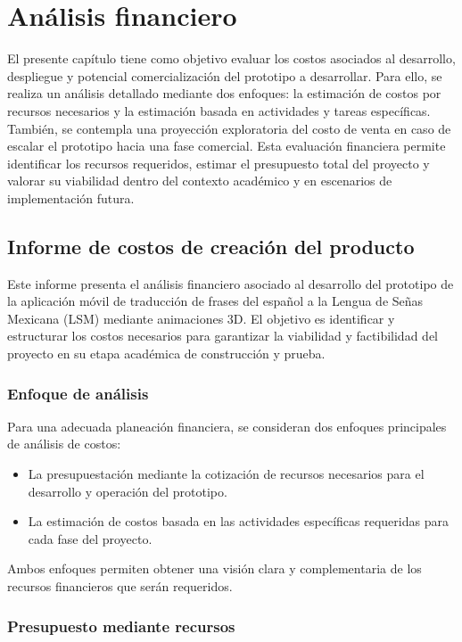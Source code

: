 \chapter{Análisis financiero}

El presente capítulo tiene como objetivo evaluar los costos asociados al desarrollo, despliegue y potencial comercialización del prototipo a desarrollar. Para ello, se realiza un análisis detallado mediante dos enfoques: la estimación de costos por recursos necesarios y la estimación basada en actividades y tareas específicas. También, se contempla una proyección exploratoria del costo de venta en caso de escalar el prototipo hacia una fase comercial. Esta evaluación financiera permite identificar los recursos requeridos, estimar el presupuesto total del proyecto y valorar su viabilidad dentro del contexto académico y en escenarios de implementación futura.


\section{Informe de costos de creación del producto}

Este informe presenta el análisis financiero asociado al desarrollo del prototipo de la aplicación móvil de traducción de frases del español a la Lengua de Señas Mexicana (LSM) mediante animaciones 3D. El objetivo es identificar y estructurar los costos necesarios para garantizar la viabilidad y factibilidad del proyecto en su etapa académica de construcción y prueba.

\subsection{Enfoque de análisis}

Para una adecuada planeación financiera, se consideran dos enfoques principales de análisis de costos: 
\begin{itemize}
	\item La presupuestación mediante la cotización de recursos necesarios para el desarrollo y operación del prototipo.
	\item La estimación de costos basada en las actividades específicas requeridas para cada fase del proyecto.
\end{itemize}
Ambos enfoques permiten obtener una visión clara y complementaria de los recursos financieros que serán requeridos.

\subsection{Presupuesto mediante recursos}

